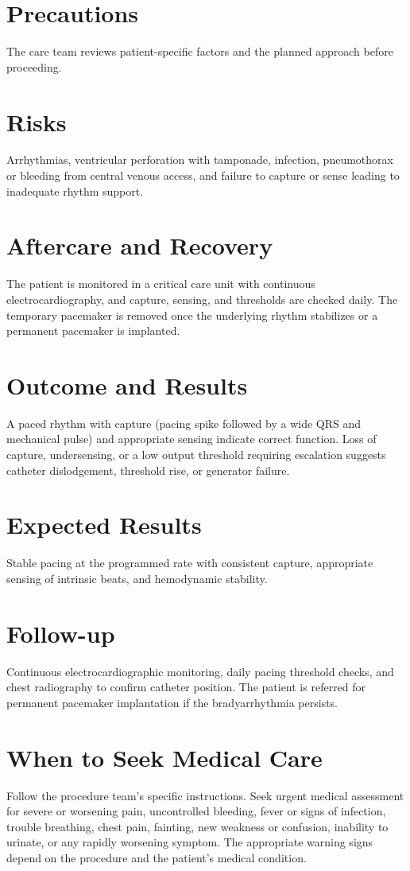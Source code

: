 \section*{Precautions}
The care team reviews patient-specific factors and the planned approach before proceeding.

\section*{Risks}
Arrhythmias, ventricular perforation with tamponade, infection, pneumothorax or bleeding from central venous access, and failure to capture or sense leading to inadequate rhythm support.

\section*{Aftercare and Recovery}
The patient is monitored in a critical care unit with continuous electrocardiography, and capture, sensing, and thresholds are checked daily. The temporary pacemaker is removed once the underlying rhythm stabilizes or a permanent pacemaker is implanted.

\section*{Outcome and Results}
A paced rhythm with capture (pacing spike followed by a wide QRS and mechanical pulse) and appropriate sensing indicate correct function. Loss of capture, undersensing, or a low output threshold requiring escalation suggests catheter dislodgement, threshold rise, or generator failure.

\section*{Expected Results}
Stable pacing at the programmed rate with consistent capture, appropriate sensing of intrinsic beats, and hemodynamic stability.

\section*{Follow-up}
Continuous electrocardiographic monitoring, daily pacing threshold checks, and chest radiography to confirm catheter position. The patient is referred for permanent pacemaker implantation if the bradyarrhythmia persists.

\section*{When to Seek Medical Care}
Follow the procedure team's specific instructions. Seek urgent medical assessment for severe or worsening pain, uncontrolled bleeding, fever or signs of infection, trouble breathing, chest pain, fainting, new weakness or confusion, inability to urinate, or any rapidly worsening symptom. The appropriate warning signs depend on the procedure and the patient's medical condition.

